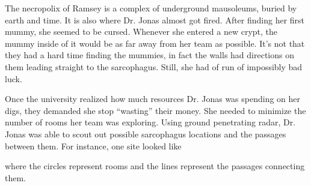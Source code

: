 The necropolix of Ramsey is a complex of underground mausoleums, buried by earth and time.
It is also where Dr. Jonas almost got fired.
After finding her first mummy, she seemed to be cursed.
Whenever she entered a new crypt, the mummy inside of it would be as far away from her team as possible.
It's not that they had a hard time finding the mummies, in fact the walls had directions on them leading straight to the sarcophagus.
Still, she had of run of impossibly bad luck.

Once the university realized how much resources Dr. Jonas was spending on her digs, they demanded she stop ``wasting'' their money.
She needed to minimize the number of rooms her team was exploring.
Using ground penetrating radar, Dr. Jonas was able to scout out possible sarcophagus locations and the passages between them.
For instance, one site looked like

\begin{center}
  \end{center}
  
where the circles represent rooms and the lines represent the passages connecting them.

